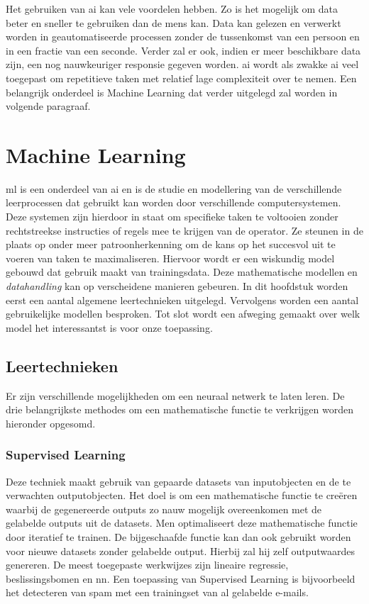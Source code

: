 Het gebruiken van \gls{ai} kan vele voordelen hebben\cite{frankwatching}\cite{SAS}. Zo is het mogelijk om data beter en sneller te gebruiken dan de mens kan. Data kan gelezen en verwerkt worden in geautomatiseerde processen zonder de tussenkomst van een persoon en in een fractie van een seconde. Verder zal er ook, indien er meer beschikbare data zijn, een nog nauwkeuriger responsie gegeven worden. \gls{ai} wordt als zwakke \gls{ai} veel toegepast om repetitieve taken met relatief lage complexiteit over te nemen. Een belangrijk onderdeel is Machine Learning dat verder uitgelegd zal worden in volgende paragraaf.




\newpage

\section{Machine Learning}
\gls{ml} is een onderdeel van \gls{ai} en is de studie en modellering van de verschillende leerprocessen dat gebruikt kan worden door verschillende computersystemen\cite{carbonell1983overview}. Deze systemen zijn hierdoor in staat om specifieke taken te voltooien zonder rechtstreekse instructies of regels mee te krijgen van de operator. Ze steunen in de plaats op onder meer patroonherkenning om de kans op het succesvol uit te voeren van taken te maximaliseren. Hiervoor wordt er een wiskundig model gebouwd dat gebruik maakt van trainingsdata. Deze mathematische modellen en \textit{datahandling} kan op verscheidene manieren gebeuren. In dit hoofdstuk worden eerst een aantal algemene leertechnieken uitgelegd. Vervolgens worden een aantal gebruikelijke modellen besproken. Tot slot wordt een afweging gemaakt over welk model het interessantst is voor onze toepassing. 

	\subsection{Leertechnieken}
	Er zijn verschillende mogelijkheden om een neuraal netwerk te laten leren. De drie belangrijkste methodes om een mathematische functie te verkrijgen worden hieronder opgesomd\cite{russell2016artificial}.
	
		
		\subsubsection{Supervised Learning} Deze techniek maakt gebruik van gepaarde datasets van inputobjecten en de te verwachten outputobjecten. Het doel is om een mathematische functie te cre\"eren waarbij de gegenereerde outputs zo nauw mogelijk overeenkomen met de gelabelde outputs uit de datasets. Men optimaliseert deze mathematische functie door iteratief te trainen. De bijgeschaafde functie kan dan ook gebruikt worden voor nieuwe datasets zonder gelabelde output. Hierbij zal hij zelf outputwaardes genereren. De meest toegepaste werkwijzes zijn lineaire regressie, beslissingsbomen en \gls{nn}. Een toepassing van Supervised Learning is bijvoorbeeld het detecteren van spam met een trainingset van al gelabelde e-mails.
		
